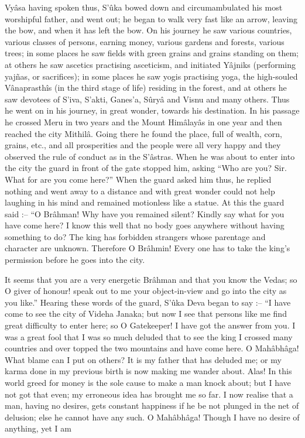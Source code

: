 Vyâsa having spoken thus, S’ûka bowed down and circumambulated his most worshipful father, and went out; he began to walk very fast like an arrow, leaving the bow, and when it has left the bow. On his journey he saw various countries, various classes of persons, earning money, various gardens and forests, various trees; in some places he saw fields with green grains and grains standing on them; at others he saw ascetics practising asceticism, and initiated Yâjniks (performing yajñas, or sacrifices); in some places he saw yogis practising yoga, the high-souled Vânaprasthîs (in the third stage of life) residing in the forest, and at others he saw devotees of S'iva, S’akti, Ganes'a, Sûryâ and Visnu and many others. Thus he went on in his journey, in great wonder, towards his destination. In his passage he crossed Meru in two years and the Mount Himâlayâs in one year and then reached the city Mithilâ. Going there he found the place, full of wealth, corn, grains, etc., and all prosperities and the people were all very happy and they observed the rule of conduct as in the S'âstras. When he was about to enter into the city the guard in front of the gate stopped him, asking “Who are you? Sir. What for are you come here?” When the guard asked him thus, he replied nothing and went away to a distance and with great wonder could not help laughing in his mind and remained motionless like a statue. At this the guard said :-- “O Brâhman! Why have you remained silent? Kindly say what for you have come here? I know this well that no body goes anywhere without having something to do? The king has forbidden strangers whose parentage and character are unknown. Therefore O Brâhmin! Every one has to take the king's permission before he goes into the city.

 

It seems that you are a very energetic Brâhman and that you know the Vedas; so O giver of honour! speak out to me your object-in-view and go into the city as you like.” Hearing these words of the guard, S’ûka Deva began to say :-- “I have come to see the city of Videha Janaka; but now I see that persons like me find great difficulty to enter here; so O Gatekeeper! I have got the answer from you. I was a great fool that I was so much deluded that to see the king I crossed many countries and over topped the two mountains and have come here. O Mahâbhâga! What blame can I put on others? It is my father that has deluded me; or my karma done in my previous birth is now making me wander about. Alas! In this world greed for money is the sole cause to make a man knock about; but I have not got that even; my erroneous idea has brought me so far. I now realise that a man, having no desires, gets constant happiness if he be not plunged in the net of delusion; else he cannot have any such. O Mahâbhâga! Though I have no desire of anything, yet I am

